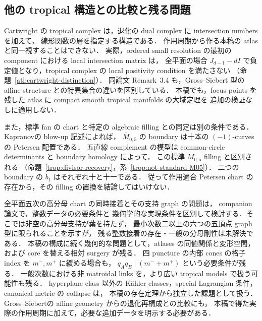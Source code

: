 \subsection{他の tropical 構造との比較と残る問題}

Cartwright の tropical complex は，退化の dual complex に intersection numbers を加えて，
線形関数の層を指定する構造である\cite[Definitions~2.5, 2.8; Construction~3.2]{CartwrightComplexes}．
作用周期から作る本稿の atlas と同一視することはできない．
実際，ordered small resolution の最初の component における local intersection matrix は，
全平面の場合 $J_{d-1}-dI$ で負定値となり，tropical complex の local positivity condition を満たさない
（命題~\ref{atl:cartwright-distinction}）．
同論文 Remark~3.4 も，Gross--Siebert 型の affine structure との特異集合の違いを区別している．
本稿でも，focus points を残した atlas に compact smooth tropical manifolds の大域定理を
追加の検証なしに適用しない．

また，標準 fan の chart と特定の algebraic filling との同定は別の条件である．
Kapranov\cite[Theorem~4.3.3]{KapranovChow}の blow-up 記述によれば，
$\overline M_{0,5}$ の boundary は十本の $(-1)$-curves の Petersen 配置である．
五直線 complement の模型は common-circle determinants と boundary homology によって，
この標準 $M_{0,5}$ filling と区別される
（命題~\ref{trop:divisor-recovery}，系~\ref{trop:not-standard-M05}）．
二つの boundary の $b_1$ はそれぞれ十と十一である．
従って作用適合 Petersen chart の存在から，その filling の置換を結論してはいけない．

全平面五次の高分母 chart の同時接着とその支持 graph の問題は，
companion 論文\cite{QuinticArithmetic}で，整数データの必要条件と
幾何学的な実現条件を区別して検討する．そこでは非空の高分母支持が葉を持たず，
最小次数二以上の六つの五頂点 graph 型に限られることを示すが，
残る整数接着の存在・一般の分母剛性は未解決である．
本稿の構成に続く幾何的な問題として，atlases の同値関係と変形空間，
および core を替える相対 surgery が残る．
四 puncture の内部 cones の格子 index を $m^-,m^+$ に緩める場合も，
$q_Aq_B\mid(m^-+m^+)$ という必要条件が残る．
一般次数における非 matroidal links を，より広い tropical models で扱う可能性も残る．
hyperplane class 以外の Kähler classes，special Lagrangian 条件，canonical metric の collapse は，
本稿の存在定理から独立した課題として扱う．
Gross--Siebert\cite{GrossSiebert}の affine geometry からの退化再構成との比較にも，
本稿で得た実際の作用周期に加えて，必要な追加データを明示する必要がある．
